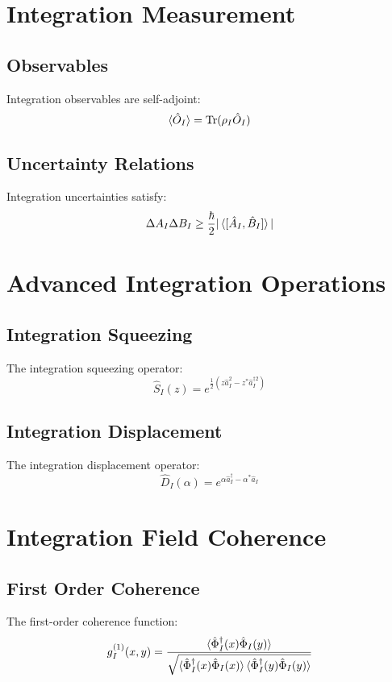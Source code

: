 \documentclass[12pt]{article}
\begin{document}
\section{Integration Measurement}
\subsection{Observables}
Integration observables are self-adjoint:
\begin{equation}
\braket{\hat{O}_I} = \text{Tr}(\rho_I\hat{O}_I)
\end{equation}
\subsection{Uncertainty Relations}
Integration uncertainties satisfy:
\begin{equation}
\Delta A_I\Delta B_I \geq \frac{\hbar}{2}|\braket{[\hat{A}_I,\hat{B}_I]}|
\end{equation}
\section{Advanced Integration Operations}
\subsection{Integration Squeezing}
The integration squeezing operator:
\begin{equation}
\hat{S}_I(z) = e^{\frac{1}{2}(z\hat{a}_I^2 - z^*\hat{a}_I^{\dagger 2})}
\end{equation}
\subsection{Integration Displacement}
The integration displacement operator:
\begin{equation}
\hat{D}_I(\alpha) = e^{\alpha\hat{a}_I^\dagger - \alpha^*\hat{a}_I}
\end{equation}
\section{Integration Field Coherence}
\subsection{First Order Coherence}
The first-order coherence function:
\begin{equation}
g_I^{(1)}(x,y) = \frac{\braket{\hat{\Phi}_I^\dagger(x)\hat{\Phi}_I(y)}}{\sqrt{\braket{\hat{\Phi}_I^\dagger(x)\hat{\Phi}_I(x)}\braket{\hat{\Phi}_I^\dagger(y)\hat{\Phi}_I(y)}}}
\end{equation}
\end{document}

